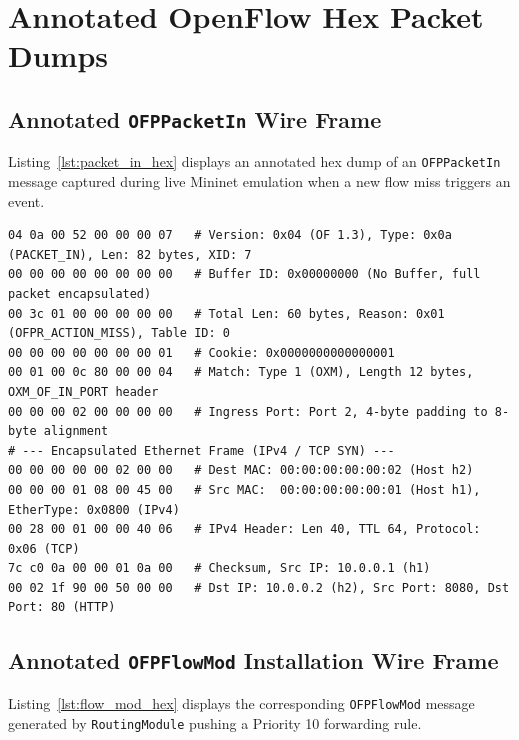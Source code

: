 \section{Annotated OpenFlow Hex Packet Dumps}

\subsection{Annotated \texttt{OFPPacketIn} Wire Frame}
Listing~\ref{lst:packet_in_hex} displays an annotated hex dump of an \texttt{OFPPacketIn} message captured during live Mininet emulation when a new flow miss triggers an event.

\begin{lstlisting}[basicstyle=\ttfamily\scriptsize, caption={Annotated Hex Dump of OFPPacketIn Message}, label={lst:packet_in_hex}]
04 0a 00 52 00 00 00 07   # Version: 0x04 (OF 1.3), Type: 0x0a (PACKET_IN), Len: 82 bytes, XID: 7
00 00 00 00 00 00 00 00   # Buffer ID: 0x00000000 (No Buffer, full packet encapsulated)
00 3c 01 00 00 00 00 00   # Total Len: 60 bytes, Reason: 0x01 (OFPR_ACTION_MISS), Table ID: 0
00 00 00 00 00 00 00 01   # Cookie: 0x0000000000000001
00 01 00 0c 80 00 00 04   # Match: Type 1 (OXM), Length 12 bytes, OXM_OF_IN_PORT header
00 00 00 02 00 00 00 00   # Ingress Port: Port 2, 4-byte padding to 8-byte alignment
# --- Encapsulated Ethernet Frame (IPv4 / TCP SYN) ---
00 00 00 00 00 02 00 00   # Dest MAC: 00:00:00:00:00:02 (Host h2)
00 00 00 01 08 00 45 00   # Src MAC:  00:00:00:00:00:01 (Host h1), EtherType: 0x0800 (IPv4)
00 28 00 01 00 00 40 06   # IPv4 Header: Len 40, TTL 64, Protocol: 0x06 (TCP)
7c c0 0a 00 00 01 0a 00   # Checksum, Src IP: 10.0.0.1 (h1)
00 02 1f 90 00 50 00 00   # Dst IP: 10.0.0.2 (h2), Src Port: 8080, Dst Port: 80 (HTTP)
\end{lstlisting}

\subsection{Annotated \texttt{OFPFlowMod} Installation Wire Frame}
Listing~\ref{lst:flow_mod_hex} displays the corresponding \texttt{OFPFlowMod} message generated by \texttt{RoutingModule} pushing a Priority 10 forwarding rule.


